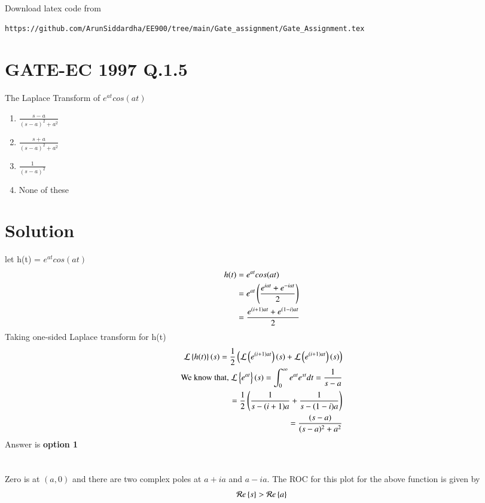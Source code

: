 \documentclass[journal,12pt,twocolumn]{IEEEtran}
\begin{document}
%
Download latex code from 
%
\begin{lstlisting}
https://github.com/ArunSiddardha/EE900/tree/main/Gate_assignment/Gate_Assignment.tex
\end{lstlisting}

\section*{GATE-EC 1997 Q.1.5}
The Laplace Transform of $e^{a t}cos(a t)$ 
\begin{enumerate}
    \item $\frac{s-a}{(s - a)^2 + a^2}$\\
  \item $\frac{s+a}{(s - a)^2 + a^2}$\\
  \item $\frac{1}{(s - a)^2}$\\
  \item None of these
\end{enumerate}
\section*{Solution}
let h(t) = $e^{a t}cos(a t)$  \\ 
\begin{align}
    h(t)&=e^{a t}cos(a t)\\
        &= e^{a t}\left(\frac{e^{i a t} + e^{-i a t}}{2}\right)\\
        &=\frac{e^{(i+1) a t} + e^{(1-i) a t}}{2}
\end{align}
Taking one-sided Laplace transform for h(t)
\begin{align}
    \mathcal{L}\left\{h(t)\right\}(s)= \frac{1}{2}\left(\mathcal{L}\left(e^{(i+1) a t}\right)(s)+\mathcal{L}\left(e^{(i+1) a t}\right)(s)\right)\\
    \text{We know that, }
    \mathcal{L}\left\{e^{at}\right\}(s)=\int^{\infty}_{0}e^{a t}e^{st}dt=\frac{1}{s-a} \\
    =\frac{1}{2}\left(\frac{1}{s-(i+1)a}+ \frac{1}{s-(1-i)a}\right)\\
    =\frac{(s-a)}{(s-a)^2+a^2}
\end{align}
Answer is \textbf{option 1}\\\\\\
Zero is at $(a,0)$ and there are two complex poles at $a + ia$ and $a-ia$.
The ROC for this plot for the above function is given by 
\begin{align}
    \mathcal{R}e\left\{s\right\}>\mathcal{R}e\left\{a\right\}
\end{align}
\end{document}
